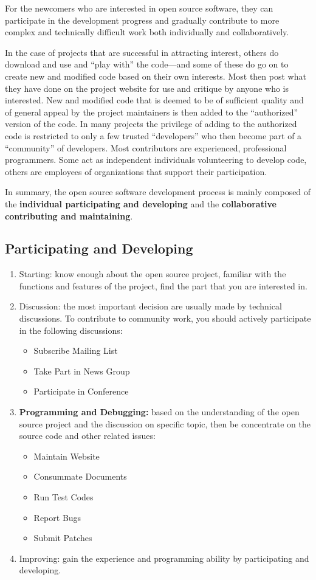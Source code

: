 \documentclass[draftclsnofoot,journal,onecolumn,12pt]{IEEEtran}
\begin{document}
For the newcomers who are interested in open source software, they can participate in the development progress and gradually contribute to more complex and technically difficult work both individually and collaboratively.

In the case of projects that are successful in attracting interest, others do download and use and “play with” the code—and some of these do go on
to create new and modified code based on their own interests. Most then post what they have done on the project website for use and critique by anyone who is interested. New and modified code that is deemed to be of sufficient quality and of general appeal by the project maintainers is then added to the “authorized” version of the code. In many projects the privilege of adding to the authorized code is restricted to only a few trusted “developers” who then become part of a “community” of developers. Most contributors are experienced, professional programmers. Some act as
independent individuals volunteering to develop code, others are employees of organizations that support their participation.

In summary, the open source software development process is mainly composed of the \textbf{individual participating and developing} and the \textbf{collaborative contributing and maintaining}.

\subsection{Participating and Developing}
\begin{enumerate}
  \item Starting: know enough about the open source project, familiar with the functions and features of the project, find the part that you are interested in.
  \item Discussion: the most important decision are usually made by technical discussions. To contribute to community work, you should actively participate in the following discussions:
  \begin{itemize}
    \item Subscribe Mailing List
    \item Take Part in News Group
    \item Participate in Conference
  \end{itemize}
  \item \textbf{Programming and Debugging:} based on the understanding of the open source project and the discussion on specific topic, then be concentrate on the source code and other related issues:
  \begin{itemize}
    \item Maintain Website
    \item Consummate Documents
    \item Run Test Codes
    \item Report Bugs
    \item Submit Patches
  \end{itemize}
  \item Improving: gain the experience and programming ability by participating and developing.
\end{enumerate}
\end{document}
